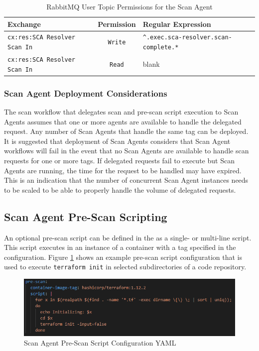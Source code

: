 \begin{table}[ht]
  \caption{RabbitMQ User Topic Permissions for the Scan Agent}  
  \label{tab:agent-mq-topic-perms}      
  \begin{tabularx}{\textwidth}{lcl}
      \toprule
      \textbf{Exchange} & \textbf{Permission} & \textbf{Regular Expression} \\
      \midrule
      \texttt{cx:res:SCA Resolver Scan In} & \texttt{Write} & \texttt{\^{}.exec.sca-resolver.scan-complete.*}\\
      \midrule
      \texttt{cx:res:SCA Resolver Scan In} & \texttt{Read} & blank \\
      \midrule
      \bottomrule
  \end{tabularx}
\end{table}

\subsubsection{Scan Agent Deployment Considerations}

The \cxoneflow scan workflow that delegates \scaresolver scan and pre-scan script execution to Scan Agents
assumes that one or more agents are available to handle the delegated request. Any number
of Scan Agents that handle the same tag can be deployed.  It is suggested that
deployment of Scan Agents considers that Scan Agent workflows will fail in the event
that no Scan Agents are available to handle scan requests for one or more tags.  If delegated requests
fail to execute but Scan Agents are running, the time for the request to be handled may have
expired.  This is an indication that the number of concurrent Scan Agent instances needs to be
scaled to be able to properly handle the volume of delegated requests.

\subsection{Scan Agent Pre-Scan Scripting}\label{sec:scan-agent-prescan}
An optional pre-scan script can be defined in the 
as a single- or multi-line script.  This script executes in an instance of a container with a
tag specified in the configuration. Figure \ref{fig:pre-scan-script-config-yaml} shows an example pre-scan
script configuration that is used to execute \texttt{terraform init} in selected subdirectories
of a code repository.


\begin{figure}[h]
    \includegraphics[scale=1]{graphics/scan-agent-pre-scan-script.png}
    \centering
    \caption{Scan Agent Pre-Scan Script Configuration YAML}
    \label{fig:pre-scan-script-config-yaml}
\end{figure}

